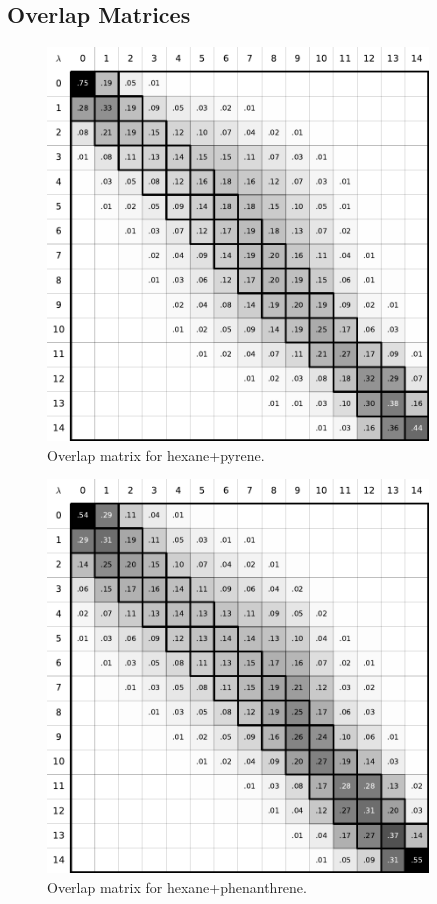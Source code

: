 \documentclass[
	12pt,				%
	openany,			%
	oneside,			%
	a4paper,			%
	english,			%
	brazil				%
	]{abntex2}
\begin{document}
\begin{apendicesenv}
\chapter{Overlap Matrices}\label{overlapmatrix}

\begin{figure}[H]
	\centering
	\includegraphics[width=0.9\textwidth]{Figures/ohex_pyr}
	\caption{Overlap matrix for hexane+pyrene.}
\end{figure}

\begin{figure}[H]
	\centering
	\includegraphics[width=0.9\textwidth]{Figures/ohex_phen}
	\caption{Overlap matrix for hexane+phenanthrene.}
\end{figure}


\end{apendicesenv}
\end{document}
